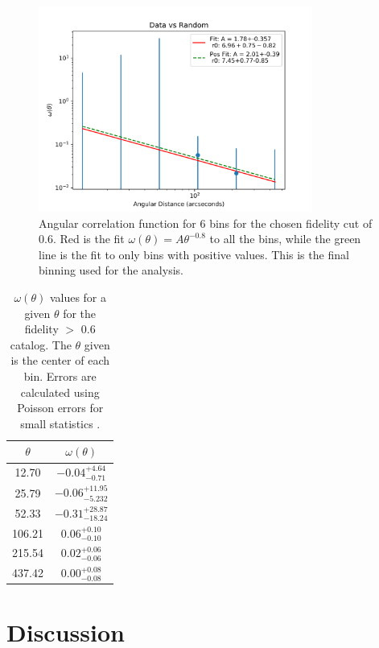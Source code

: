 \begin{figure}[!htp]
\centering \includegraphics[width=90mm]{clustering_two/Data_vs_Random_20000_bin6_sn0_6_NFalse.png}
\caption{Angular correlation function for 6 bins for the chosen fidelity cut of 0.6. Red is the fit $\omega(\theta) = A\theta^{-0.8}$ to all the bins, while the green line is the fit to only bins with positive values. This is the final binning used for the analysis. }
\label{fig:Angular_binnings}
\end{figure}

\begin{table}[!htp]
\caption{$\omega(\theta)$ values for a given $\theta$ for the fidelity $>$ 0.6 catalog. The $\theta$ given is the center of each bin. Errors are calculated using Poisson errors for small statistics \cite{1986ApJ...303..336G}.}
\centering
\begin{tabular}{cc}\label{table:Angular_binnings}
$\theta$ & $\omega(\theta)$          \\
\hline
12.70    & $-0.04_{-0.71}^{+4.64}$   \\
25.79    & $-0.06_{-5.232}^{+11.95}$ \\
52.33    & $-0.31_{-18.24}^{+28.87}$ \\
106.21   & $0.06_{-0.10}^{+0.10}$    \\
215.54   & $0.02_{-0.06}^{+0.06}$    \\
437.42   & $0.00_{-0.08}^{+0.08}$   
\end{tabular}
\end{table}

\section{Discussion}\label{sec:Clust_Disc}


